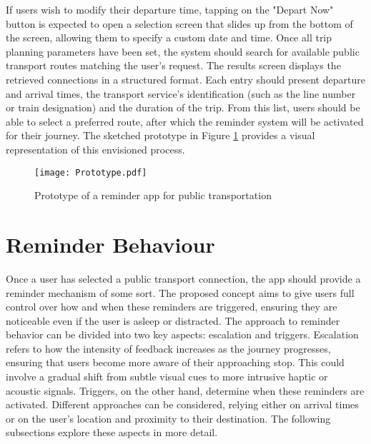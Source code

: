 If users wish to modify their departure time, tapping on the "Depart Now" button is expected to open a selection screen that slides up from the bottom of the screen, allowing them to specify a custom date and time. 
Once all trip planning parameters have been set, the system should search for available public transport routes matching the user's request.
The results screen displays the retrieved connections in a structured format. 
Each entry should present departure and arrival times, the transport service's identification (such as the line number or train designation) and the duration of the trip.
From this list, users should be able to select a preferred route, after which the reminder system will be activated for their journey.
The sketched prototype in Figure \ref{fig:prototype} provides a visual representation of this envisioned process.

\begin{figure}[htbp]
    \centering
    \texttt{[image: Prototype.pdf]}
    \caption{Prototype of a reminder app for public transportation}
    \label{fig:prototype}
\end{figure}

\section{Reminder Behaviour}
\label{sec:behaviour}
Once a user has selected a public transport connection, the app should provide a reminder mechanism of some sort.
The proposed concept aims to give users full control over how and when these reminders are triggered, ensuring they are noticeable even if the user is asleep or distracted.
The approach to reminder behavior can be divided into two key aspects: escalation and triggers. 
Escalation refers to how the intensity of feedback increases as the journey progresses, ensuring that users become more aware of their approaching stop. 
This could involve a gradual shift from subtle visual cues to more intrusive haptic or acoustic signals. 
Triggers, on the other hand, determine when these reminders are activated. 
Different approaches can be considered, relying either on arrival times or on the user's location and proximity to their destination. 
The following subsections explore these aspects in more detail.

